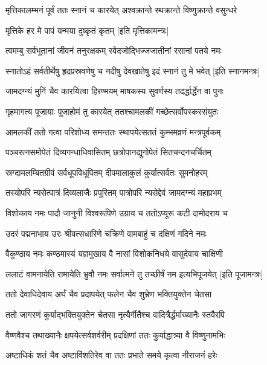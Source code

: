 \twolineshloka
{मृत्तिकालम्भनं पूर्वं ततः स्नानं च कारयेत्}
{अश्वक्रान्ते रथक्रान्ते विष्णुक्रान्ते वसुन्धरे}%

\onelineshloka
{मृत्तिके हर मे पापं यन्मया दुष्कृतं कृतम्}%
[इति मृत्तिकामन्त्रः]

\twolineshloka
{त्वमम्बु सर्वभूतानां जीवनं तनुरक्षकम्}
{स्वेदजोद्भिज्जजातीनां रसानां पतये नमः}%

\twolineshloka
{स्नातोऽहं सर्वतीर्थेषु ह्रदप्रस्रवणेषु च}
{नदीषु देवखातेषु इदं स्नानं तु मे भवेत्}%
[इति स्नानमन्त्रः]

\twolineshloka
{जामदग्न्यं मुनिं चैव कारयित्वा हिरण्मयम्}
{माषकस्य सुवर्णस्य तदर्द्धार्द्धेन वा पुनः}%

\twolineshloka
{गृहमागत्य पूजायाः पूजाहोमं तु कारयेत्}
{ततश्चामलकीं गच्छेत्सर्वोपस्करसंयुतः}%

\twolineshloka
{आमलकीं ततो गत्वा परिशोध्य समन्ततः}
{स्थापयेत्सततं कुम्भमव्रणं मन्त्रपूर्वकम्}%

\twolineshloka
{पञ्चरत्नसमोपेतं दिव्यगन्धाधिवासितम्}
{छत्रोपानद्युगोपेतं सितचन्दनचर्चितम्}%

\twolineshloka
{स्रग्दामलम्बितग्रीवं सर्वधूपविधूपितम्}
{दीपमालाकुलं कुर्यात्सर्वतः सुमनोहरम्}%

\twolineshloka
{तस्योपरि न्यसेत्पात्रं दिव्यलाजैः प्रपूरितम्}
{पात्रोपरि न्यसेद्देवं जामदग्न्यं महाप्रभम्}%

\twolineshloka
{विशोकाय नमः पादौ जानुनी विश्वरूपिणे}
{उग्राय च ततोऽप्यूरू कटी दामोदराय च}%

\twolineshloka
{उदरं पद्मनाभाय उरः श्रीवत्सधारिणे}
{चक्रिणे वामबाहुं च दक्षिणं गदिने नमः}%

\twolineshloka
{वैकुण्ठाय नमः कण्ठमास्यं यज्ञमुखाय वै}
{नासां विशोकनिधये वासुदेवाय चाक्षिणी}%

\twolineshloka
{ललाटं वामनायेति रामायेति भ्रुवौ नमः}
{सर्वात्मने तु तच्छीर्षं नम इत्यभिपूजयेत्}%
[इति पूजामन्त्रः]

\twolineshloka
{ततो देवाधिदेवाय अर्घं चैव प्रदापयेत्}
{फलेन चैव शुभ्रेण भक्तियुक्तेन चेतसा}%

\twolineshloka
{ततो जागरणं कुर्याद्भक्तियुक्तेन चेतसा}
{नृत्यैर्गीतैश्च वादित्रैर्द्धर्माख्यानैः स्तवैरपि}%

\twolineshloka
{वैष्णवैश्च तथाख्यानैः क्षपयेत्सर्वशर्वरीम्}
{प्रदक्षिणां ततः कुर्याद्धात्र्या वै विष्णुनामभिः}%

\twolineshloka
{अष्टाधिकं शतं चैव अष्टाविंशतिरेव वा}
{ततः प्रभाते समये कृत्वा नीराजनं हरेः}%

